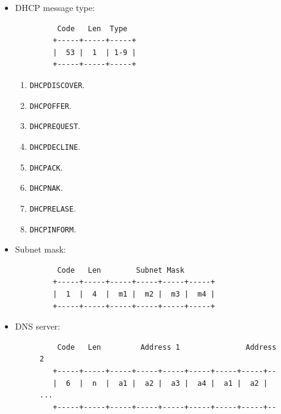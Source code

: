 \documentclass[pdftex,12pt,a4paper]{article}
\begin{document}
                \begin{itemize}
                    \item DHCP  message type:

                        \begin{figure}[!h]
                            \centering
                        \begin{verbatim}    Code   Len  Type
   +-----+-----+-----+
   |  53 |  1  | 1-9 |
   +-----+-----+-----+\end{verbatim}
                        \end{figure}

                        \begin{enumerate}
                            \item \texttt{DHCPDISCOVER}.
                            \item \texttt{DHCPOFFER}.
                            \item \texttt{DHCPREQUEST}.
                            \item \texttt{DHCPDECLINE}.
                            \item \texttt{DHCPACK}.
                            \item \texttt{DHCPNAK}.
                            \item \texttt{DHCPRELASE}.
                            \item \texttt{DHCPINFORM}.
                        \end{enumerate}

                    \item Subnet mask:

                        \begin{figure}[!h]
                            \centering
                        \begin{verbatim}    Code   Len        Subnet Mask
   +-----+-----+-----+-----+-----+-----+
   |  1  |  4  |  m1 |  m2 |  m3 |  m4 |
   +-----+-----+-----+-----+-----+-----+\end{verbatim}
                        \end{figure}

                    \item DNS server:

                        \begin{figure}[!h]
                            \centering
                        \begin{verbatim}    Code   Len         Address 1               Address 2
   +-----+-----+-----+-----+-----+-----+-----+-----+--
   |  6  |  n  |  a1 |  a2 |  a3 |  a4 |  a1 |  a2 |  ...
   +-----+-----+-----+-----+-----+-----+-----+-----+--\end{verbatim}
                        \end{figure}

                 \end{itemize}
\end{document}
